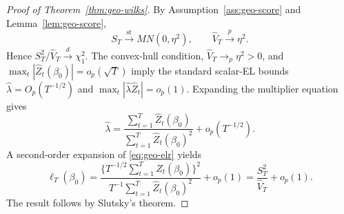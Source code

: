 ﻿\documentclass[11pt]{article}
\begin{document}
\begin{proof}[Proof of Theorem~\ref{thm:geo-wilks}]
By Assumption~\ref{ass:geo-score} and Lemma~\ref{lem:geo-score},
\[
    S_T\xrightarrow{\mathrm{st}}MN(0,\eta^2),
    \qquad
    \widehat V_T\xrightarrow{p}\eta^2.
\]
Hence \(S_T^2/\widehat V_T\xrightarrow{d}\chi_1^2\). The convex-hull condition, \(\widehat V_T\to_p\eta^2>0\), and \(\max_t|\widehat Z_t(\beta_0)|=o_p(\sqrt T)\) imply the standard scalar-EL bounds \(\widehat\lambda=O_p(T^{-1/2})\) and \(\max_t|\widehat\lambda\widehat Z_t|=o_p(1)\). Expanding the multiplier equation gives
\[
    \widehat\lambda
      =\frac{\sum_{t=1}^T\widehat Z_t(\beta_0)}
             {\sum_{t=1}^T\widehat Z_t(\beta_0)^2}
       +o_p(T^{-1/2}).
\]
A second-order expansion of \eqref{eq:geo-elr} yields
\[
    \ell_T(\beta_0)
      =\frac{\{T^{-1/2}\sum_{t=1}^T\widehat Z_t(\beta_0)\}^2}
             {T^{-1}\sum_{t=1}^T\widehat Z_t(\beta_0)^2}
       +o_p(1)
      =\frac{S_T^2}{\widehat V_T}+o_p(1).
\]
The result follows by Slutsky's theorem.
\end{proof}
\end{document}
